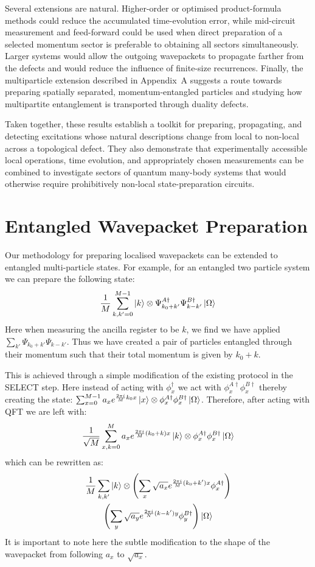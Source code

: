 \documentclass[aps,floatfix,10pt,amssymb,amsfont,amsmath,superscriptaddress,float,nofootinbib,longbibliography,nobalancelastpage,twocolumn,prx]{revtex4-2}
\begin{document}
Several extensions are natural. Higher-order or optimised product-formula methods could reduce the accumulated time-evolution error, while mid-circuit measurement and feed-forward could be used when direct preparation of a selected momentum sector is preferable to obtaining all sectors simultaneously. Larger systems would allow the outgoing wavepackets to propagate farther from the defects and would reduce the influence of finite-size recurrences. Finally, the multiparticle extension described in Appendix~A suggests a route towards preparing spatially separated, momentum-entangled particles and studying how multipartite entanglement is transported through duality defects.

Taken together, these results establish a toolkit for preparing, propagating, and detecting excitations whose natural descriptions change from local to non-local across a topological defect. They also demonstrate that experimentally accessible local operations, time evolution, and appropriately chosen measurements can be combined to investigate sectors of quantum many-body systems that would otherwise require prohibitively non-local state-preparation circuits.

\appendix
\section{Entangled Wavepacket Preparation}
\label{appendix}
Our methodology for preparing localised wavepackets can be extended to entangled multi-particle states. For example, for an entangled two particle system we can prepare the following state:
\begin{equation}
    \frac{1}{M}\sum_{k,k'=0}^{M-1}\ket{k}\otimes \Psi_{k_0+k'}^{A\dagger}\Psi_{k-k'}^{B\dagger} \ket{\Omega}
\end{equation}
Here when measuring the ancilla register to be $k$, we find we have applied $\sum_{k'} \Psi_{k_0+k'} \Psi_{k-k'}$. Thus we have created a pair of particles entangled through their momentum such that their total momentum is given by $k_0+k$.

This is achieved through a simple modification of the existing protocol in the \textsc{SELECT} step. Here instead of acting with $\phi_x^{\dagger}$ we act with $\phi^{A\dagger}_x\phi^{B\dagger}_x$ thereby creating the state: $\sum_{x=0}^{M-1} a_xe^{\frac{2\pi i}{M}k_0x} \ket{x}\otimes \phi^{A\dagger}_x\phi^{B\dagger}_x\ket{\Omega}$. Therefore, after acting with \textsc{QFT} we are left with:
\begin{equation}
    \frac{1}{\sqrt{M}}\sum^M_{x,k=0} a_x e^{ \frac{2\pi i}{M}(k_0+k) x}\ket{k}\otimes \phi^{A\dagger}_x\phi^{B\dagger}_x\ket{\Omega}
\end{equation}
which can be rewritten as:
\begin{multline}
            \frac{1}{M}\sum_{k,k'} \ket{k}\otimes\left(\sum_x \sqrt{a_x}e^{\frac{2\pi i}{M} (k_0+k')x} \phi^{A\dagger}_x\right)\\\left(\sum_y \sqrt{a_y} e^{\frac{2\pi i}{N} (k-k')y} \phi^{B\dagger}_y\right)\ket{\Omega}
\end{multline}
It is important to note here the subtle modification to the shape of the wavepacket from following $a_x$ to $\sqrt{a_x}$.
\end{document}
